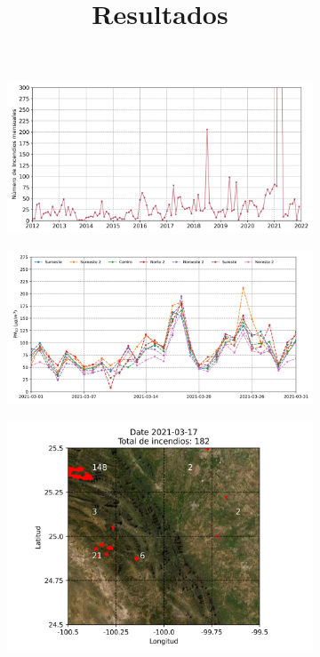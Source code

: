 \title{Resultados}

\begin{figure}[H]
    \centering
    \changefontsizes{10pt}
    \begin{subfigure}{0.34\textwidth}
        \includegraphics[width=1\linewidth]{Graphics/Fire_Per_Month.png}
        \caption*{}
    \end{subfigure}
    \hspace*{0.2cm}
    \begin{subfigure}{0.34\textwidth}
        \includegraphics[width=1\linewidth]{Graphics/PM10.png}
        \caption*{}
    \end{subfigure}
    \hspace*{0.2cm}
    \begin{subfigure}{0.23\textwidth}
        \includegraphics[width=1\linewidth]{Graphics/2021-03-17.png}

\end{subfigure}
\end{figure}
